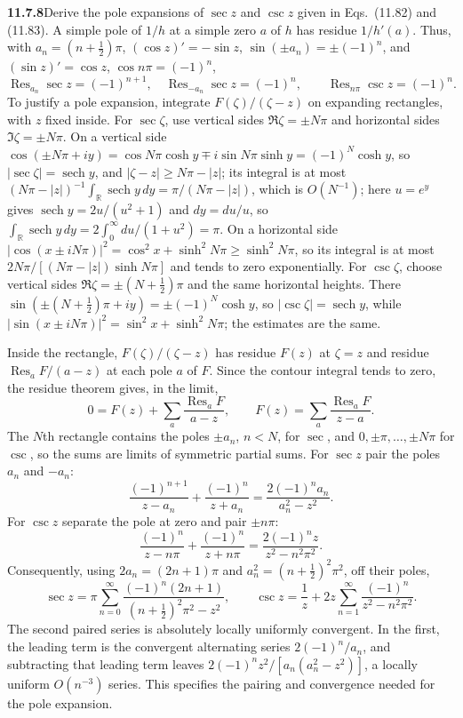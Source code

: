 \par\bigskip
\noindent\textbf{11.7.8}\quad Derive the pole expansions of $\sec z$ and
$\csc z$ given in Eqs.~(11.82) and (11.83).
\solution
A simple pole of $1/h$ at a simple zero $a$ of $h$ has residue
$1/h'(a)$. Thus, with $a_n=(n+\tfrac12)\pi$, $(\cos z)'=-\sin z$,
$\sin(\pm a_n)=\pm(-1)^n$, and $(\sin z)'=\cos z$, $\cos n\pi=(-1)^n$,
\[
\operatorname{Res}_{a_n}\sec z=(-1)^{n+1},\quad
\operatorname{Res}_{-a_n}\sec z=(-1)^n,\qquad
\operatorname{Res}_{n\pi}\csc z=(-1)^n.
\]
To justify a pole expansion, integrate $F(\zeta)/(\zeta-z)$ on
expanding rectangles, with $z$ fixed inside. For $\sec\zeta$, use
vertical sides $\Re\zeta=\pm N\pi$ and horizontal sides
$\Im\zeta=\pm N\pi$. On a vertical side
$\cos(\pm N\pi+iy)=\cos N\pi\cosh y\mp i\sin N\pi\sinh y=(-1)^N\cosh y$,
so $|\sec\zeta|=\operatorname{sech}y$, and $|\zeta-z|\ge N\pi-|z|$;
its integral is at most
$(N\pi-|z|)^{-1}\int_{\mathbb R}\operatorname{sech}y\,dy=\pi/(N\pi-|z|)$,
which is $O(N^{-1})$; here $u=e^y$ gives
$\operatorname{sech}y=2u/(u^2+1)$ and $dy=du/u$, so
$\int_{\mathbb R}\operatorname{sech}y\,dy=2\int_0^\infty du/(1+u^2)=\pi$.
On a horizontal side
$|\cos(x\pm iN\pi)|^2=\cos^2x+\sinh^2N\pi\ge\sinh^2N\pi$, so its
integral is at most $2N\pi/[(N\pi-|z|)\sinh N\pi]$ and
tends to zero exponentially. For $\csc\zeta$, choose vertical sides
$\Re\zeta=\pm(N+\tfrac12)\pi$ and the same horizontal heights.
There $\sin(\pm(N+\tfrac12)\pi+iy)=\pm(-1)^N\cosh y$, so
$|\csc\zeta|=\operatorname{sech}y$, while
$|\sin(x\pm iN\pi)|^2=\sin^2x+\sinh^2N\pi$;
the estimates are the same.

Inside the rectangle, $F(\zeta)/(\zeta-z)$ has residue $F(z)$ at
$\zeta=z$ and residue $\operatorname{Res}_aF/(a-z)$ at each pole $a$
of $F$. Since the contour integral tends to zero, the residue theorem
gives, in the limit,
\[
0=F(z)+\sum_a\frac{\operatorname{Res}_a F}{a-z},
\qquad
F(z)=\sum_a\frac{\operatorname{Res}_a F}{z-a}.
\]
The $N$th rectangle contains the poles $\pm a_n$, $n<N$, for $\sec$, and
$0,\pm\pi,\dots,\pm N\pi$ for $\csc$, so the sums are limits of
symmetric partial sums. For $\sec z$ pair the poles $a_n$ and $-a_n$:
\[
\frac{(-1)^{n+1}}{z-a_n}+\frac{(-1)^n}{z+a_n}
=\frac{2(-1)^na_n}{a_n^2-z^2}.
\]
For $\csc z$ separate the pole at zero and pair $\pm n\pi$:
\[
\frac{(-1)^n}{z-n\pi}+\frac{(-1)^n}{z+n\pi}
=\frac{2(-1)^nz}{z^2-n^2\pi^2}.
\]
Consequently, using $2a_n=(2n+1)\pi$ and $a_n^2=(n+\tfrac12)^2\pi^2$,
off their poles,
\[
\boxed{\sec z=\pi\sum_{n=0}^{\infty}
\frac{(-1)^n(2n+1)}{(n+\tfrac12)^2\pi^2-z^2}},\qquad
\boxed{\csc z=\frac1z+2z\sum_{n=1}^{\infty}
\frac{(-1)^n}{z^2-n^2\pi^2}}.
\]
The second paired series is absolutely locally uniformly convergent.
In the first, the leading term is the convergent alternating series
$2(-1)^n/a_n$, and subtracting that leading term leaves
$2(-1)^nz^2/[a_n(a_n^2-z^2)]$, a locally uniform $O(n^{-3})$ series. This specifies the pairing and convergence
needed for the pole expansion.


